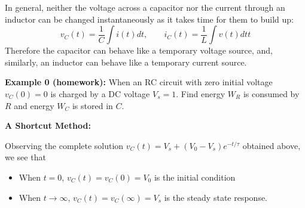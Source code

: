 \documentclass{article}
\begin{document}
In general, neither the voltage across a capacitor nor the current through
an inductor can be changed instantaneously as it takes time for them to 
build up:
\begin{equation}
  v_C(t)=\frac{1}{C}\int i(t) dt,\;\;\;\;\;\;\;i_C(t)=\frac{1}{L}\int v(t) dtt
\end{equation}
Therefore the capacitor can behave like a temporary voltage source, and,
similarly, an inductor can behave like a temporary current source.


{\bf Example 0 (homework):} When an RC circuit with zero initial voltage 
$v_C(0)=0$ is charged by a DC voltage $V_s=1$. Find energy $W_R$ is consumed 
by $R$ and energy $W_C$ is stored in $C$. 

\begin{comment}
{\bf Solution:} Given 
\begin{equation}
  v_C(t)=1-e^{-t/\tau},\;\;\;\;\;\;\mbox{and}\;\;\;\;\;\;
  i_C(t)=\frac{1}{R}e^{-t/\tau}
\end{equation}
we find the energy consumed by $R$:
\begin{equation}
  R \int_0^\infty i_C(t)^2\,dt
  =\frac{1}{R} \int_0^\infty e^{-2t/\tau}\,dt
  =\frac{\tau}{2R}=\frac{C}{2}
\end{equation}
and the energy stored in $C$:
\begin{equation}
   \int_0^\infty i_C(t)\,v_C(t)\,dt
  =\frac{1}{R}\int_0^\infty e^{-t/\tau}(1-e^{-t/\tau})\,dt
  =\frac{1}{R}\int_0^\infty \left(e^{-t/\tau}-e^{-2t/\tau}\right)\,dt  
  =\frac{1}{R}\left(\tau- \frac{\tau}{2}\right)
  =\frac{C}{2}
\end{equation}
In other words, half of the energy provided by the DC source is dissipated
by $R$ while the other half is stored in $C$.
\end{comment}

{\bf A Shortcut Method:}

Observing the complete solution $v_C(t)=V_s+(V_0-V_s) e^{-t/\tau}$ obtained
above, we see that
\begin{itemize}
\item When $t=0$, $v_C(t)=v_C(0)=V_0$ is the initial condition
\item When $t\rightarrow \infty$, $v_C(t)=v_C(\infty)=V_s$ is the steady 
  state response.
\end{itemize}
\end{document}
